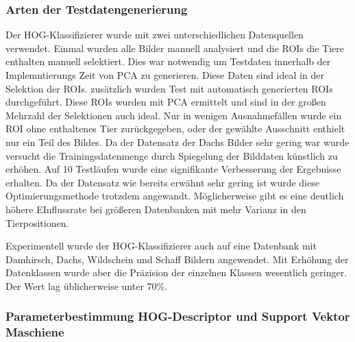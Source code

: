 \subsubsection{Arten der Testdatengenerierung} \label{sssec:test_data_HOG}
Der HOG-Klassifizierer wurde mit zwei unterschiedlichen Datenquellen verwendet. Einmal wurden alle Bilder manuell analysiert und die ROIs die Tiere enthalten manuell selektiert. Dies war notwendig um Testdaten innerhalb der Implemntierungs Zeit von PCA zu generieren. Diese Daten sind ideal in der Selektion der ROIs. zusätzlich wurden Test mit automatisch generierten ROIs durchgeführt. Diese ROIs wurden mit PCA ermittelt und sind in der großen Mehrzahl der Selektionen auch ideal. Nur in wenigen Ausnahmefällen wurde ein ROI ohne enthaltenes Tier zurückgegeben, oder der gewählte Ausschnitt enthielt nur ein Teil des Bildes.
Da der Datensatz der Dachs Bilder sehr gering war wurde versucht die Trainingsdatenmenge durch Spiegelung der Bilddaten künstlich zu erhöhen. Auf 10 Testläufen wurde eine signifikante Verbesserung der Ergebnisse erhalten. Da der Datensatz wie bereits erwähnt sehr gering ist wurde diese Optimierungsmethode trotzdem angewandt. Möglicherweise gibt es eine deutlich höhere EInflussrate bei größeren Datenbanken mit mehr Varianz in den Tierpositionen.

Experimentell wurde der HOG-Klassifizierer auch auf eine Datenbank mit Damhirsch, Dachs, Wildschein und Schaff Bildern angewendet. Mit Erhöhung der Datenklassen wurde aber die Präzision der einzelnen Klassen wesentlich geringer. Der Wert lag üblicherweise unter 70\%. 

\subsubsection{Parameterbestimmung HOG-Descriptor und Support Vektor Maschiene} \label{sssec:HOG:parmeter}

